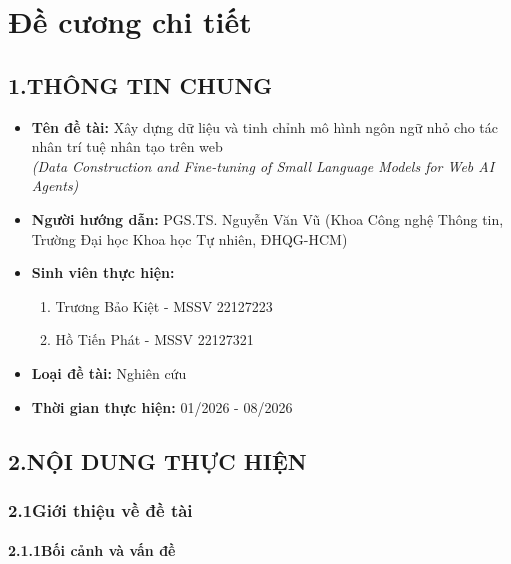 
\chapter*{Đề cương chi tiết}
\thispagestyle{empty}%

\section*{1.\quad THÔNG TIN CHUNG}

\begin{itemize}
  \item \textbf{Tên đề tài:} Xây dựng dữ liệu và tinh chỉnh mô hình ngôn ngữ
  nhỏ cho tác nhân trí tuệ nhân tạo trên web \\
  \textit{(Data Construction and Fine-tuning of Small Language Models for Web
  AI Agents)}
  \item \textbf{Người hướng dẫn:} PGS.TS. Nguyễn Văn Vũ (Khoa Công nghệ
  Thông tin, Trường Đại học Khoa học Tự nhiên, ĐHQG-HCM)
  \item \textbf{Sinh viên thực hiện:}
  \begin{enumerate}
    \item Trương Bảo Kiệt - MSSV 22127223
    \item Hồ Tiến Phát - MSSV 22127321
  \end{enumerate}
  \item \textbf{Loại đề tài:} Nghiên cứu
  \item \textbf{Thời gian thực hiện:} 01/2026 - 08/2026
\end{itemize}

\section*{2.\quad NỘI DUNG THỰC HIỆN}

\subsection*{2.1\quad Giới thiệu về đề tài}

\subsubsection*{2.1.1\quad Bối cảnh và vấn đề}

